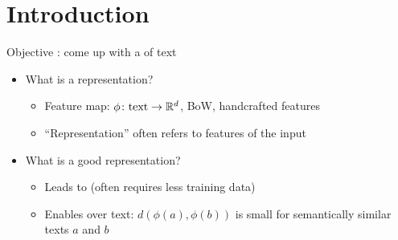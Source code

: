 \documentclass[usenames,dvipsnames,notes,11pt,aspectratio=169]{beamer}
\begin{document}

\section{Introduction}

\begin{frame}
    {Objective}    
    : come up with a  of text\\
    \begin{itemize}[<+->]
        \item What is a representation?
            \begin{itemize}
                \item Feature map: $\phi\colon \text{text} \rightarrow \mathbb{R}^d$, \eg BoW, handcrafted features
                \item ``Representation'' often refers to  features of the input
            \end{itemize}
        \item What is a good representation?
            \begin{itemize}
                \item Leads to  (often requires less training data)
                \item Enables  over text: 
                    $d(\phi(a), \phi(b))$ is small for semantically similar texts $a$ and $b$
            \end{itemize}
    \end{itemize}
\end{frame}
\end{document}
